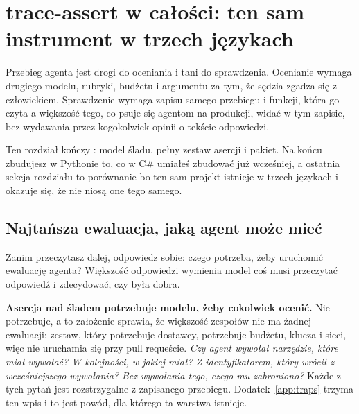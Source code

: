 
\chapter{trace-assert w całości: ten sam instrument w trzech językach}
\label{ch:traceassert}

\noindent
Przebieg agenta jest drogi do oceniania i tani do sprawdzenia. Ocenianie
wymaga drugiego modelu, rubryki, budżetu i argumentu za tym, że sędzia
zgadza się z człowiekiem. Sprawdzenie wymaga zapisu samego przebiegu i
funkcji, która go czyta \dash{} a większość tego, co psuje się agentom na
produkcji, widać w tym zapisie, bez wydawania przez kogokolwiek opinii o
tekście odpowiedzi.

Ten rozdział kończy : model śladu, pełny zestaw asercji
i pakiet. Na końcu zbudujesz w Pythonie to, co w C\# umiałeś zbudować już
wcześniej, a ostatnia sekcja rozdziału to porównanie \dash{} bo ten sam
projekt istnieje w trzech językach i okazuje się, że nie niosą one tego
samego.

\section{Najtańsza ewaluacja, jaką agent może mieć}
\label{sec:ch14-cheapest}

Zanim przeczytasz dalej, odpowiedz sobie: czego potrzeba, żeby uruchomić
ewaluację agenta? Większość odpowiedzi wymienia model \dash{} coś musi
przeczytać odpowiedź i zdecydować, czy była dobra.

\begin{trapbox}
\textbf{Asercja nad śladem potrzebuje modelu, żeby cokolwiek ocenić.} Nie
potrzebuje, a to założenie sprawia, że większość zespołów nie ma żadnej
ewaluacji: zestaw, który potrzebuje dostawcy, potrzebuje budżetu, klucza i
sieci, więc nie uruchamia się przy pull requeście. \emph{Czy agent wywołał
narzędzie, które miał wywołać? W kolejności, w jakiej miał? Z
identyfikatorem, który wrócił z wcześniejszego wywołania? Bez wywołania
tego, czego mu zabroniono?} Każde z tych pytań jest rozstrzygalne z
zapisanego przebiegu. Dodatek~\ref{app:traps} trzyma ten wpis i to jest
powód, dla którego ta warstwa istnieje.
\end{trapbox}

